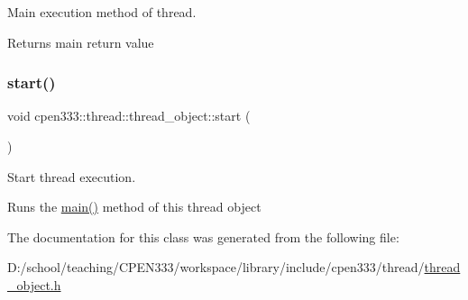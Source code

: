 Main execution method of thread. 

\begin{DoxyReturn}{Returns}
main return value 
\end{DoxyReturn}
\mbox{\label{classcpen333_1_1thread_1_1thread__object_ae4484909a3f4418c0c0db318d615bde1}} 
\subsubsection{\texorpdfstring{start()}{start()}}
{\footnotesize\ttfamily void cpen333\+::thread\+::thread\+\_\+object\+::start (\begin{DoxyParamCaption}{ }\end{DoxyParamCaption})\hspace{0.3cm}{\ttfamily [inline]}}



Start thread execution. 

Runs the \hyperlink{classcpen333_1_1thread_1_1thread__object_adbd74f6f7461d90a1c12e8078aa5f3af}{main()} method of this thread object 

The documentation for this class was generated from the following file\+:\begin{DoxyCompactItemize}
\item 
D\+:/school/teaching/\+C\+P\+E\+N333/workspace/library/include/cpen333/thread/\hyperlink{thread__object_8h}{thread\+\_\+object.\+h}\end{DoxyCompactItemize}
